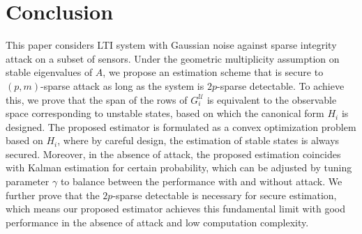 \documentclass[12pt]{article}  %
\newcommand{\Ic}{{\mathcal{I}}}
\newcommand{\Uc}{{\mathcal{U}}}
\begin{document}
%





\section{Conclusion}\label{sec:conclusion}
This paper considers LTI system with Gaussian noise against sparse integrity attack on a subset of sensors. 
Under the geometric multiplicity assumption on stable eigenvalues of $A$, we propose an estimation scheme that is secure to $(p,m)$-sparse attack as long as the system is $2p$-sparse detectable. 
To achieve this, we prove that the span of the rows of $G^\Uc_i$ is equivalent to the observable space corresponding to unstable states, based on which the canonical form $H_i$ is designed. The proposed estimator is formulated as a convex optimization problem based on $H_i$, where by careful design, the estimation of stable states is always secured. 
Moreover, in the absence of attack, the proposed estimation coincides with Kalman estimation for certain probability, which can be adjusted by tuning parameter $\gamma$ to balance between the performance with and without attack.
We further prove that the $2p$-sparse detectable is necessary for secure estimation, which means our proposed estimator achieves this fundamental limit with good performance in the absence of attack and low computation complexity.
\end{document}
